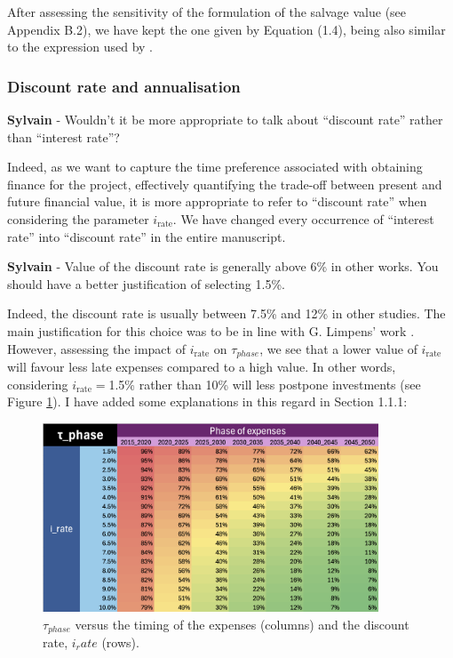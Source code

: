 \documentclass[12pt,a4paper]{article}
\begin{document}
\begin{mdframed}[style=manuscript] %
After assessing the sensitivity of the formulation of the salvage value (see Appendix B.2), we have kept the one given by Equation (1.4), being also similar to the expression used by \citet{prina2019transition}.
\end{mdframed}

\subsubsection{Discount rate and annualisation}

\begin{mdframed}[style=comment] %
{\color{purple} \textbf{Sylvain}} - Wouldn't it be more appropriate to talk about ``discount rate'' rather than ``interest rate''?
\end{mdframed}

\noindent Indeed, as we want to capture the time preference associated with obtaining finance for the project, effectively quantifying the trade-off between present and future financial value, it is more appropriate to refer to ``discount rate'' when considering the parameter $i_{\text{rate}}$. We have changed every occurrence of ``interest rate'' into ``discount rate'' {\color{blue}in the entire manuscript}.

\begin{mdframed}[style=comment] %
{\color{purple} \textbf{Sylvain}} - Value of the discount rate is generally above 6\% in other works. You should have a better justification of selecting 1.5\%.
\end{mdframed}

\noindent Indeed, the discount rate is usually between 7.5\% and 12\% in other studies. The main justification for this choice was to be in line with G. Limpens' work \cite{limpens2021generating}. However, assessing the impact of $i_{\text{rate}}$ on $\tau_{phase}$, we see that a lower value of $i_{\text{rate}}$ will favour less late expenses compared to a high value. In other words, considering $i_{\text{rate}}=$1.5\% rather than 10\% will less postpone investments (see Figure \ref{fig:tau_phase}). I have added some explanations in this regard {\color{blue}in Section 1.1.1}:

\begin{figure}[htbp!]
\centering
\includegraphics[width=10cm]{tau_phase.png}
\caption{$\tau_{phase}$ versus the timing of the expenses (columns) and the discount rate, $i_rate$ (rows).}
\label{fig:tau_phase}
\end{figure}
\end{document}
